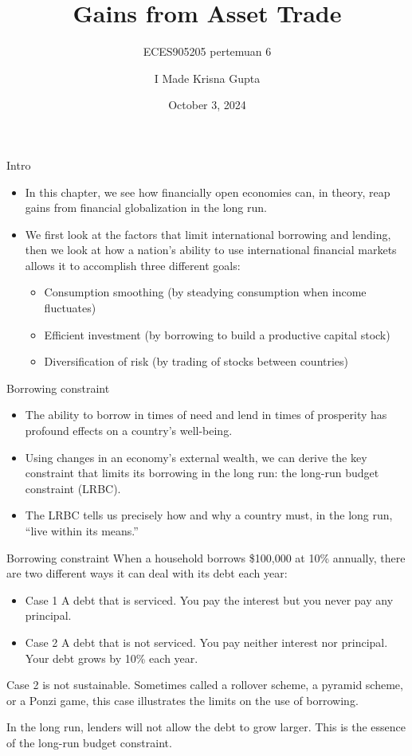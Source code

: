 \documentclass[
  ignorenonframetext,
]{beamer}
\title{Gains from Asset Trade}
\subtitle{ECES905205 pertemuan 6}
\author{I Made Krisna Gupta}
\date{October 3, 2024}
\providecommand{\tightlist}{%
  \setlength{\itemsep}{0pt}\setlength{\parskip}{0pt}}\usepackage{longtable,booktabs,array}
\begin{document}
\frame{\titlepage}


\begin{frame}{Intro}
\label{intro}
\begin{itemize}
\item
  In this chapter, we see how financially open economies can, in theory,
  reap gains from financial globalization in the long run.
\item
  We first look at the factors that limit international borrowing and
  lending, then we look at how a nation's ability to use international
  financial markets allows it to accomplish three different goals:

  \begin{itemize}
  \tightlist
  \item
    Consumption smoothing (by steadying consumption when income
    fluctuates)
  \item
    Efficient investment (by borrowing to build a productive capital
    stock)
  \item
    Diversification of risk (by trading of stocks between countries)
  \end{itemize}
\end{itemize}
\end{frame}

\begin{frame}{Borrowing constraint}
\label{borrowing-constraint}
\begin{itemize}
\tightlist
\item
  The ability to borrow in times of need and lend in times of prosperity
  has profound effects on a country's well-being.
\item
  Using changes in an economy's external wealth, we can derive the key
  constraint that limits its borrowing in the long run: the long-run
  budget constraint (LRBC).
\item
  The LRBC tells us precisely how and why a country must, in the long
  run, ``live within its means.''
\end{itemize}
\end{frame}

\begin{frame}{Borrowing constraint}
\label{borrowing-constraint-1}
When a household borrows \$100,000 at 10\% annually, there are two
different ways it can deal with its debt each year:

\begin{itemize}
\tightlist
\item
  Case 1 A debt that is serviced. You pay the interest but you never pay
  any principal.
\item
  Case 2 A debt that is not serviced. You pay neither interest nor
  principal. Your debt grows by 10\% each year.
\end{itemize}

Case 2 is not sustainable. Sometimes called a rollover scheme, a pyramid
scheme, or a Ponzi game, this case illustrates the limits on the use of
borrowing.

In the long run, lenders will not allow the debt to grow larger. This is
the essence of the long-run budget constraint.
\end{frame}
\end{document}
